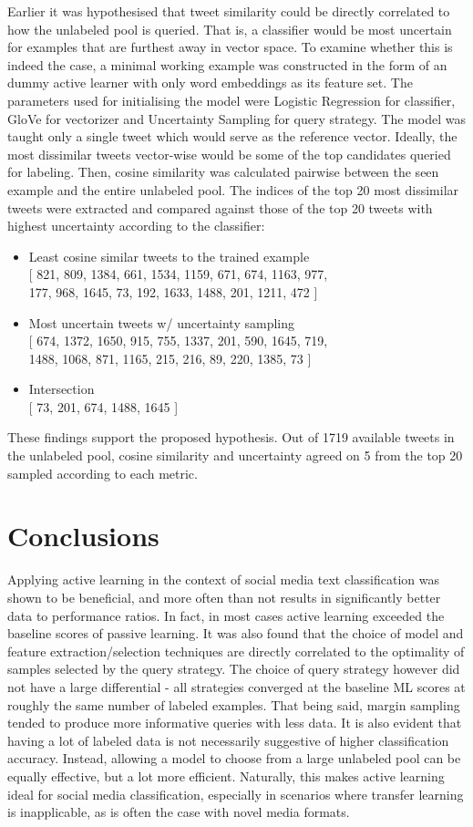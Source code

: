 \documentclass[a4paper,12pt]{article}
\begin{document}
Earlier it was hypothesised that tweet similarity could be directly correlated to how the unlabeled pool is queried. That is, a classifier would be most uncertain for examples that are furthest away in vector space. To examine whether this is indeed the case, a minimal working example was constructed in the form of an dummy active learner with only word embeddings as its feature set. The parameters used for initialising the model were Logistic Regression for classifier, GloVe for vectorizer and Uncertainty Sampling for query strategy. The model was taught only a single tweet which would serve as the reference vector. Ideally, the most dissimilar tweets vector-wise would be some of the top candidates queried for labeling. Then, cosine similarity was calculated pairwise between the seen example and the entire unlabeled pool. The indices of the top 20 most dissimilar tweets were extracted and compared against those of the top 20 tweets with highest uncertainty according to the classifier:
\begin{itemize}
    \item Least cosine similar tweets to the trained example\\
    {[ 821, 809, 1384, 661, 1534, 1159, 671, 674, 1163, 977,\\ 177, 968, 1645, 73, 192, 1633, 1488, 201, 1211, 472 ]}
    \item Most uncertain tweets w/ uncertainty sampling\\
    {[ 674, 1372, 1650, 915, 755, 1337, 201, 590, 1645, 719,\\ 1488, 1068, 871, 1165, 215, 216, 89, 220, 1385, 73 ]}
    \item Intersection\\
    {[ 73, 201, 674, 1488, 1645 ]}
\end{itemize}
These findings support the proposed hypothesis. Out of 1719 available tweets in the unlabeled pool, cosine similarity and uncertainty agreed on 5 from the top 20 sampled according to each metric.
\newpage
\section{Conclusions}
Applying active learning in the context of social media text classification was shown to be beneficial, and more often than not results in significantly better data to performance ratios. In fact, in most cases active learning exceeded the baseline scores of passive learning. It was also found that the choice of model and feature extraction/selection techniques are directly correlated to the optimality of samples selected by the query strategy. The choice of query strategy however did not have a large differential - all strategies converged at the baseline ML scores at roughly the same number of labeled examples. That being said, margin sampling tended to produce more informative queries with less data. It is also evident that having a lot of labeled data is not necessarily suggestive of higher classification accuracy. Instead, allowing a model to choose from a large unlabeled pool can be equally effective, but a lot more efficient. Naturally, this makes active learning ideal for social media classification, especially in scenarios where transfer learning is inapplicable, as is often the case with novel media formats.
\newpage
\end{document}
